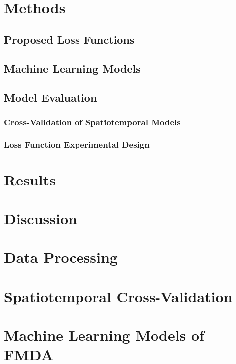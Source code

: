 \documentclass[11pt]{article}%
\begin{document}
\section{Methods}

\subsection{Proposed Loss Functions}
\subsection{Machine Learning Models}
\subsection{Model Evaluation}
\subsubsection{Cross-Validation of Spatiotemporal Models}
\subsubsection{Loss Function Experimental Design}

\section{Results}

\section{Discussion}



\newpage




\appendix
\section{Data Processing} 
\label{app:data}

\section{Spatiotemporal Cross-Validation} \label{app:cv}
\section{Machine Learning Models of FMDA} \label{app:ml}
\end{document}
